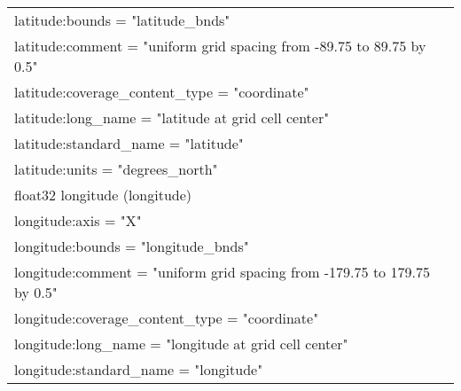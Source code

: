 \begin{longtable}{|p{\textwidth}|}
\rowcolor{Apricot}\hspace{0.5cm}\hspace{0.5cm}latitude:bounds = "latitude\_bnds"\\
\rowcolor{Apricot}\hspace{0.5cm}\hspace{0.5cm}latitude:comment = "uniform grid spacing from -89.75 to 89.75 by 0.5"\\
\rowcolor{Apricot}\hspace{0.5cm}\hspace{0.5cm}latitude:coverage\_content\_type = "coordinate"\\
\rowcolor{Apricot}\hspace{0.5cm}\hspace{0.5cm}latitude:long\_name = "latitude at grid cell center"\\
\rowcolor{Apricot}\hspace{0.5cm}\hspace{0.5cm}latitude:standard\_name = "latitude"\\
\rowcolor{Apricot}\hspace{0.5cm}\hspace{0.5cm}latitude:units = "degrees\_north"\\
\rowcolor{Apricot}\hspace{0.5cm}float32 longitude (longitude)\\
\rowcolor{Apricot}\hspace{0.5cm}\hspace{0.5cm}longitude:axis = "X"\\
\rowcolor{Apricot}\hspace{0.5cm}\hspace{0.5cm}longitude:bounds = "longitude\_bnds"\\
\rowcolor{Apricot}\hspace{0.5cm}\hspace{0.5cm}longitude:comment = "uniform grid spacing from -179.75 to 179.75 by 0.5"\\
\rowcolor{Apricot}\hspace{0.5cm}\hspace{0.5cm}longitude:coverage\_content\_type = "coordinate"\\
\rowcolor{Apricot}\hspace{0.5cm}\hspace{0.5cm}longitude:long\_name = "longitude at grid cell center"\\
\rowcolor{Apricot}\hspace{0.5cm}\hspace{0.5cm}longitude:standard\_name = "longitude"\\

\end{longtable}
